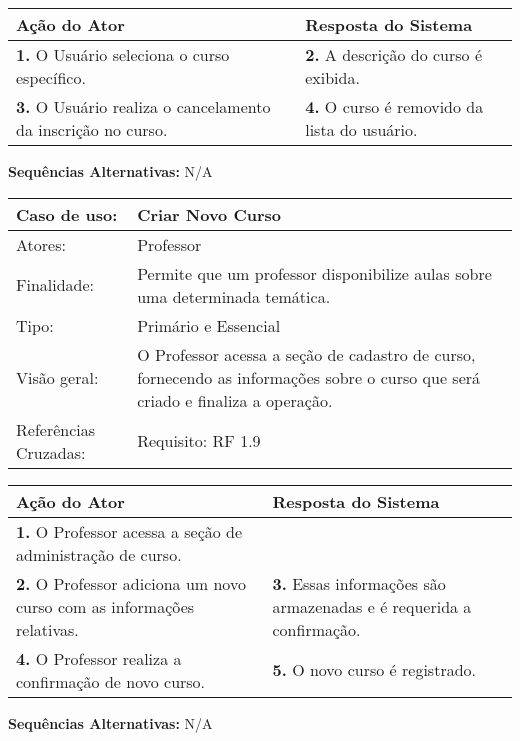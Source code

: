 \documentclass[12pt,a4paper,onecolumn,titlepage]{article}
\begin{document}
\begin{center}
\def\arraystretch{1.1}
\begin{tabular}{|p{6cm}|p{6cm}|}

\hline
\textbf{Ação do Ator} & \textbf{Resposta do Sistema} \\ \hline
\textbf{1.} O Usuário seleciona o curso específico. & \textbf{2.} A descrição do curso é exibida. \\ \hline
\textbf{3.} O Usuário realiza o cancelamento da inscrição no curso. & \textbf{4.} O curso é removido da lista do usuário. \\ \hline
\end{tabular}
\end{center}
\textbf{Sequências Alternativas:} N/A

\newpage



\begin{table}[h!]
\begin{center}
\begin{tabular}{p{2.5cm} p{9.5cm}}
Caso de uso: & \textbf{Criar Novo Curso} \\ \hline
Atores: & Professor \\ \hline
Finalidade: & Permite que um professor disponibilize aulas sobre uma determinada temática. \\ \hline
Tipo: & Primário e Essencial\\ \hline
Visão geral: & O Professor acessa a seção de cadastro de curso, fornecendo as informações sobre o curso que será criado e finaliza a operação. \\ \hline
Referências Cruzadas: & Requisito: RF 1.9

\end{tabular}
\end{center}
\end{table}



\begin{center}
\def\arraystretch{1.1}
\begin{tabular}{|p{6cm}|p{6cm}|}

\hline
\textbf{Ação do Ator} & \textbf{Resposta do Sistema} \\ \hline
\textbf{1.} O Professor acessa a seção de administração de curso. &  \\ \hline
\textbf{2.} O Professor adiciona um novo curso com as informações relativas. & \textbf{3.} Essas informações são armazenadas e é requerida a confirmação. \\ \hline
\textbf{4.} O Professor realiza a confirmação de novo curso. & \textbf{5.} O novo curso é registrado. \\ \hline
\end{tabular}
\end{center}
\textbf{Sequências Alternativas:} N/A
\newpage
\end{document}
